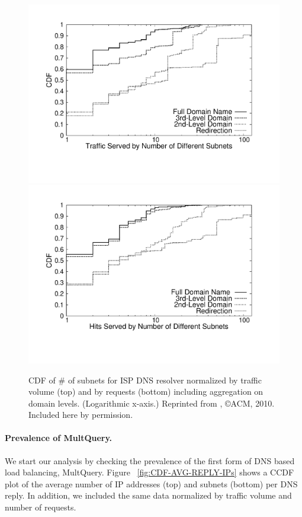 \begin{figure}[htbp]
  \center
   \includegraphics[height=0.7\linewidth]{figures-pdf/SubnetsByBytes}
   \includegraphics[height=0.7\linewidth]{figures-pdf/SubnetsByHits}
  \caption{CDF of \# of subnets for ISP DNS resolver normalized by traffic
    volume  (top) and by requests (bottom) including aggregation on
    domain levels. (Logarithmic x-axis.) Reprinted from \cite{PADIS2010}, \copyright ACM, 2010. Included here by permission.}
  \label{fig:CDF-IPPAF-Subnets}
\end{figure}

\paragraph{Prevalence of MultQuery.} We start our analysis by checking the
prevalence of the first form of DNS based load balancing, MultQuery. Figure~
\ref{fig:CDF-AVG-REPLY-IPs} shows a CCDF plot of the average number of IP
addresses (top) and subnets (bottom) per DNS reply. In addition, we included
the same data normalized by traffic volume and number of requests.

